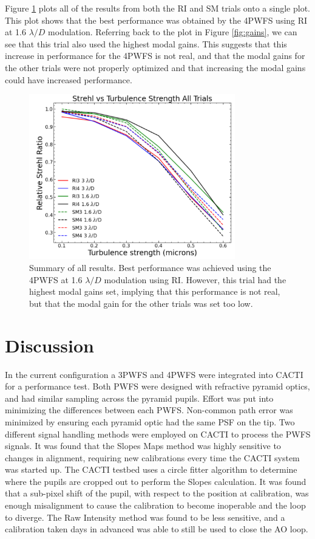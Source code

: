 Figure \ref{fig:All} plots all of the results from both the RI and SM trials onto a single plot. This plot shows that the best performance was obtained by the 4PWFS using RI at 1.6 $\lambda /D$ modulation. Referring back to the plot in Figure \ref{fig:gains}, we can see that this trial also used the highest modal gains. This suggests that this increase in performance for the 4PWFS is not real, and that the modal gains for the other trials were not properly optimized and that increasing the modal gains could have increased performance.


\begin{figure}
    \centering
    \includegraphics[width=0.8\textwidth]{Chapter Materials/Chapter Five Materials/AllTrialsStrehlVSTurb.png}
    \caption{Summary of all results. Best performance was achieved using the 4PWFS at 1.6 $\lambda/D$ modulation using RI. However, this trial had the highest modal gains set, implying that this performance is not real, but that the modal gain for the other trials was set too low.}
    \label{fig:All}
\end{figure}

\section{Discussion}
In the current configuration a 3PWFS and 4PWFS were integrated into CACTI for a performance test. Both PWFS were designed with refractive pyramid optics, and had similar sampling across the pyramid pupils. Effort was put into minimizing the differences between each PWFS. Non-common path error was minimized by ensuring each pyramid optic had the same PSF on the tip. Two different signal handling methods were employed on CACTI to process the PWFS signals. It was found that the Slopes Maps method was highly sensitive to changes in alignment, requiring new calibrations every time the CACTI system was started up. The CACTI testbed uses a circle fitter algorithm to determine where the pupils are cropped out to perform the Slopes calculation. It was found that a sub-pixel shift of the pupil, with respect to the position at calibration, was enough misalignment to cause the calibration to become inoperable and the loop to diverge. The Raw Intensity method was found to be less sensitive, and a calibration taken days in advanced was able to still be used to close the AO loop.

